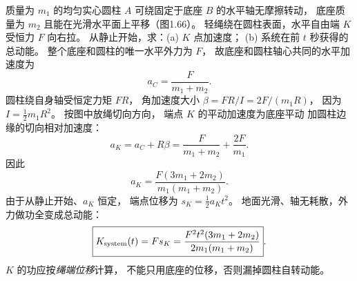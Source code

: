 质量为 $m_1$ 的均匀实心圆柱 $A$
可绕固定于底座 $B$ 的水平轴无摩擦转动，
底座质量为 $m_2$ 且能在光滑水平面上平移（图1.66）。
轻绳绕在圆柱表面，水平自由端 $K$ 受恒力 $F$ 向右拉。
从静止开始，求：(a) $K$ 点加速度；
(b) 系统在前 $t$ 秒获得的总动能。
\exsolution
整个底座和圆柱的唯一水平外力为 $F$，
故底座和圆柱轴心共同的水平加速度为
\[
a_C=\frac{F}{m_1+m_2}.
\]
圆柱绕自身轴受恒定力矩 $FR$，
角加速度大小
$\beta=FR/I=2F/(m_1R)$，
因为 $I=\frac12m_1R^2$。
按图中放绳切向方向，
端点 $K$ 的平动加速度为底座平动
加圆柱边缘的切向相对加速度：
\[
a_K=a_C+R\beta
=\frac F{m_1+m_2}+\frac{2F}{m_1}.
\]
因此
\[
\boxed{a_K=\frac{F(3m_1+2m_2)}{m_1(m_1+m_2)}}.
\]
由于从静止开始、$a_K$ 恒定，
端点位移为 $s_K=\frac12a_Kt^2$。
地面光滑、轴无耗散，外力做功全变成总动能：
\[
\boxed{K_{\rm system}(t)=Fs_K
=\frac{F^2t^2(3m_1+2m_2)}
{2m_1(m_1+m_2)}}.
\]
\excheck $K$ 的功应按\emph{绳端位移}计算，
不能只用底座的位移，否则漏掉圆柱自转动能。
